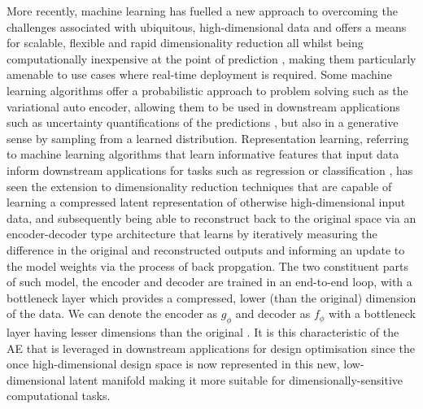 \documentclass{article}
\begin{document}
More recently, machine learning has fuelled a new approach to overcoming the challenges associated with ubiquitous, high-dimensional data and offers a means for scalable, flexible and rapid dimensionality reduction all whilst being computationally inexpensive at the point of prediction \citep{Deshpande2024}, making them particularly amenable to use cases where real-time deployment is required.  Some machine learning algorithms offer a probabilistic approach to problem solving such as the variational auto encoder, allowing them to be used in downstream applications such as uncertainty quantifications of the predictions \citep{Donnelly2024}, but also in a generative sense by sampling from a learned distribution. Representation learning, referring to machine learning algorithms that learn informative features that input data inform downstream applications for tasks such as regression or classification \citep{Bengio2012}, has seen the extension to dimensionality reduction techniques that are capable of learning a compressed latent representation of otherwise high-dimensional input data, and subsequently being able to reconstruct back to the original space via an encoder-decoder type architecture that learns by iteratively measuring the difference in the original and reconstructed outputs \citep{Huang2022} and informing an update to the model weights via the process of back propgation. The two constituent parts of such model, the encoder and decoder are trained in an end-to-end loop, with a bottleneck layer which provides a compressed, lower (than the original) dimension of the data. We can denote the encoder as  $g_\phi$ and decoder as $f_\phi$ with a bottleneck layer having lesser dimensions than the original \citep{DAgostino2018}. It is this characteristic of the AE that is leveraged in downstream applications for design optimisation since the once high-dimensional design space is now represented in this new, low-dimensional latent manifold making it more suitable for dimensionally-sensitive computational tasks.
\end{document}
